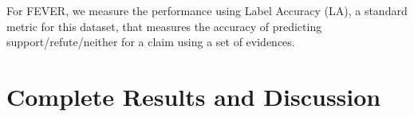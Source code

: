 For FEVER, we measure the performance using Label Accuracy (LA), a standard metric for this dataset, that measures the accuracy of predicting support/refute/neither for a claim using a set of evidences.


\section{Complete Results and Discussion}
\label{app:complete_results}


\begin{table*}[t]
    \centering
    \caption{Complete results of our joint models for AS2 datasets when \textbf{re-ranking the answer candidates ranked in top-k by Pairwise RoBERTa-Base}. MSPP, FT refer to our pre-training task and finetuning respectively. We indicate the prediction head (IE/AE) used for both pre-training and finetuning.}
    \label{tab:app_results_as2_topk}
\end{table*}

